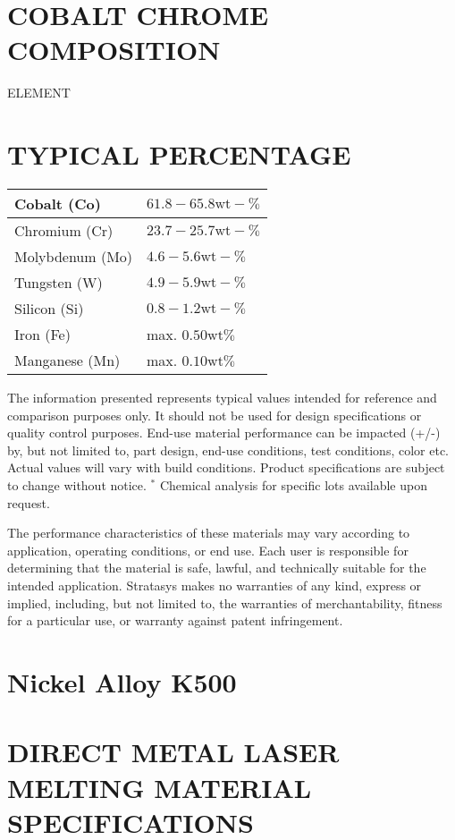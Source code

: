 \documentclass[10pt]{article}
\begin{document}
\section*{COBALT CHROME COMPOSITION}
 ELEMENT\section*{TYPICAL PERCENTAGE}
\begin{center}
\begin{tabular}{|l|l|}
\hline
Cobalt (Co) & $61.8-65.8 \mathrm{wt}-\%$ \\
\hline
Chromium (Cr) & $23.7-25.7 \mathrm{wt}-\%$ \\
\hline
Molybdenum (Mo) & $4.6-5.6 \mathrm{wt}-\%$ \\
\hline
Tungsten (W) & $4.9-5.9 \mathrm{wt}-\%$ \\
\hline
Silicon (Si) & $0.8-1.2 \mathrm{wt}-\%$ \\
\hline
Iron (Fe) & max. $0.50 \mathrm{wt} \%$ \\
\hline
Manganese (Mn) & max. $0.10 \mathrm{wt} \%$ \\
\hline
\end{tabular}
\end{center}

The information presented represents typical values intended for reference and comparison purposes only. It should not be used for design specifications or quality control purposes. End-use material performance can be impacted (+/-) by, but not limited to, part design, end-use conditions, test conditions, color etc. Actual values will vary with build conditions. Product specifications are subject to change without notice. ${ }^{*}$ Chemical analysis for specific lots available upon request.

The performance characteristics of these materials may vary according to application, operating conditions, or end use. Each user is responsible for determining that the material is safe, lawful, and technically suitable for the intended application. Stratasys makes no warranties of any kind, express or implied, including, but not limited to, the warranties of merchantability, fitness for a particular use, or warranty against patent infringement.

\section*{Nickel Alloy K500}
\section*{DIRECT METAL LASER MELTING MATERIAL SPECIFICATIONS}
\end{document}
